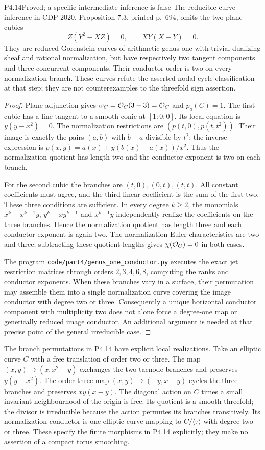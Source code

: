 \begin{statement}{P4.14}{Proved; a specific intermediate inference is false}
The reducible-curve inference in CDP 2020, Proposition 7.3,
printed p.~694, omits the two plane cubics
\[
 Z(Y^2-XZ)=0,\qquad XY(X-Y)=0.
\]
They are reduced Gorenstein curves of arithmetic genus one with
trivial dualizing sheaf and rational normalization, but have
respectively two tangent components and three concurrent
components. Their conductor order is two on every normalization
branch. These curves refute the asserted nodal-cycle
classification at that step; they are not counterexamples to
the threefold sign assertion.
\end{statement}
\begin{proof}
Plane adjunction gives $\omega_C=\mathcal O_C(3-3)=\mathcal O_C$ and
$p_a(C)=1$. The first cubic has a line tangent to a smooth
conic at $[1:0:0]$. Its local equation is $y(y-x^2)=0$.
The normalization restrictions are $(p(t,0),p(t,t^2))$.
Their image is exactly the pairs $(a,b)$ with $b-a$ divisible
by $t^2$: the inverse expression is
$p(x,y)=a(x)+y(b(x)-a(x))/x^2$. Thus the normalization
quotient has length two and the conductor exponent is two on
each branch.

For the second cubic the branches are $(t,0),(0,t),(t,t)$.
All constant coefficients must agree, and the third linear
coefficient is the sum of the first two. These three conditions
are sufficient. In every degree $k\ge2$, the monomials
$x^k-x^{k-1}y$, $y^k-xy^{k-1}$ and $x^{k-1}y$ independently
realize the coefficients on the three branches. Hence the
normalization quotient has length three and each conductor
exponent is again two. The normalization Euler characteristics
are two and three; subtracting these quotient lengths gives
$\chi(\mathcal O_C)=0$ in both cases.

The program \texttt{code/part4/genus\_one\_conductor.py}
executes the exact jet restriction matrices through orders
$2,3,4,6,8$, computing the ranks and conductor exponents.
When these branches vary in a surface, their permutation may
assemble them into a single normalization curve covering the
image conductor with degree two or three. Consequently a
unique horizontal conductor component with multiplicity two
does not alone force a degree-one map or generically reduced
image conductor. An additional argument is needed at that
precise point of the general irreducible case.
\end{proof}

The branch permutations in P4.14 have explicit local realizations.
Take an elliptic curve $C$ with a free translation of order two or
three. The map $(x,y)\mapsto(x,x^2-y)$ exchanges the two tacnode
branches and preserves $y(y-x^2)$. The order-three map
$(x,y)\mapsto(-y,x-y)$ cycles the three branches and preserves
$xy(x-y)$. The diagonal action on $C$ times a small invariant
neighbourhood of the origin is free. Its quotient is a smooth
threefold; the divisor is irreducible because the action permutes
its branches transitively. Its normalization conductor is one
elliptic curve mapping to $C/\langle\tau\rangle$ with degree two
or three. These specify the finite morphisms in P4.14 explicitly;
they make no assertion of a compact torus smoothing.

